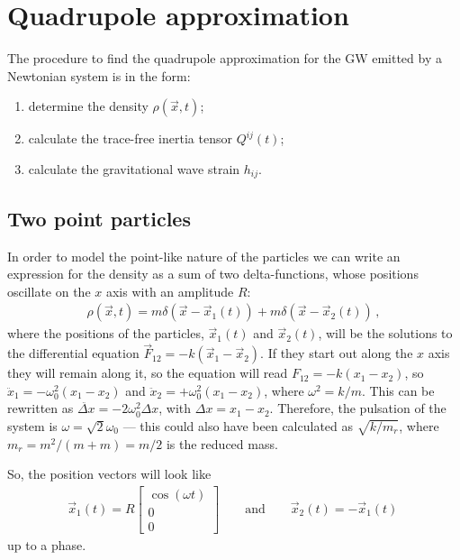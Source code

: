 \documentclass[main.tex]{subfiles}
\begin{document}
\section{Quadrupole approximation}

The procedure to find the quadrupole approximation 
for the GW emitted by a Newtonian system is in the form: 
\begin{enumerate}
    \item determine the density \(\rho (\vec{x}, t)\);
    \item calculate the trace-free inertia tensor \(Q^{ij}(t)\);
    \item calculate the gravitational wave strain \(h_{ij}\). 
\end{enumerate}

\subsection{Two point particles}

In order to model the point-like nature of the particles we can write an expression for the density as a sum of two delta-functions,
whose positions oscillate on the \(x\) axis with an amplitude \(R\):
%
\begin{align}
\rho (\vec{x}, t) = m\delta (\vec{x} - \vec{x}_1(t)) + m\delta (\vec{x} - \vec{x}_2 (t))                                                           \,,
\end{align}
%
where the positions of the particles, \(\vec{x}_1 (t)\) and \(\vec{x}_2 (t)\), will be the solutions to the differential equation \(\vec{F}_{12} = - k (\vec{x}_1 - \vec{x}_2)\). 
If they start out along the \(x\) axis they will remain along it, so the equation will read \(F_{12} = - k (x_1 - x_2 )\), so \(\ddot{x}_1 = - \omega_0 ^2 (x_1 - x_2 )\) and \(\ddot{x}_2 = + \omega_0 ^2 (x_1 - x_2 )\), where \(\omega^2 = k / m\). 
This can be rewritten as \(\ddot{\Delta x} = - 2 \omega_0 ^2 \Delta x \), with \(\Delta x = x_1 - x_2 \). 
Therefore, the pulsation of the system is \(\omega = \sqrt{2} \omega_0  \) --- this could also have been calculated as \(\sqrt{k / m_r}\), where \(m_r = m^2/ (m+m) = m/ 2\) is the reduced mass.

So, the position vectors will look like
%
\begin{align}
\vec{x}_1 (t) = R \left[\begin{array}{c}
\cos(\omega t) \\ 
0 \\ 
0
\end{array}\right]
\qquad \text{and} \qquad
\vec{x}_2 (t) = - \vec{x}_1 (t)
\,
\end{align}
%
up to a phase. 
\end{document}
